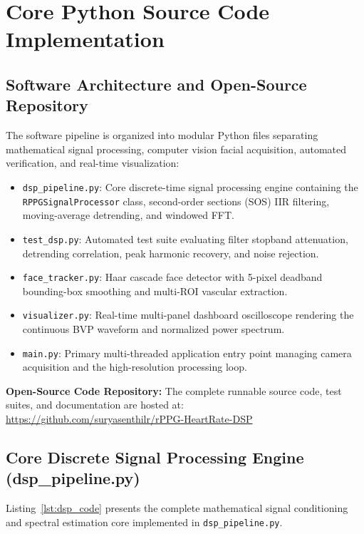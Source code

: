 \documentclass[11pt,a4paper]{report}
\begin{document}
\chapter{Core Python Source Code Implementation}

\section{Software Architecture and Open-Source Repository}
The software pipeline is organized into modular Python files separating mathematical signal processing, computer vision facial acquisition, automated verification, and real-time visualization:
\begin{itemize}
    \item \texttt{dsp\_pipeline.py}: Core discrete-time signal processing engine containing the \texttt{RPPGSignalProcessor} class, second-order sections (SOS) IIR filtering, moving-average detrending, and windowed FFT.
    \item \texttt{test\_dsp.py}: Automated test suite evaluating filter stopband attenuation, detrending correlation, peak harmonic recovery, and noise rejection.
    \item \texttt{face\_tracker.py}: Haar cascade face detector with 5-pixel deadband bounding-box smoothing and multi-ROI vascular extraction.
    \item \texttt{visualizer.py}: Real-time multi-panel dashboard oscilloscope rendering the continuous BVP waveform and normalized power spectrum.
    \item \texttt{main.py}: Primary multi-threaded application entry point managing camera acquisition and the high-resolution processing loop.
\end{itemize}

\noindent\textbf{Open-Source Code Repository:} The complete runnable source code, test suites, and documentation are hosted at:\\
\url{https://github.com/suryasenthilr/rPPG-HeartRate-DSP}

\section{Core Discrete Signal Processing Engine (dsp\_pipeline.py)}
Listing~\ref{lst:dsp_code} presents the complete mathematical signal conditioning and spectral estimation core implemented in \texttt{dsp\_pipeline.py}.
\end{document}
